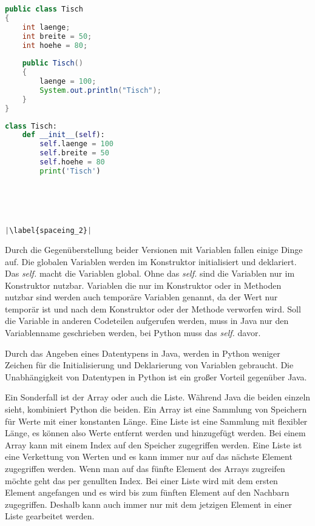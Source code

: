 \begin{minipage}{.5\linewidth}
\begin{lstlisting}[language=java,caption={Variablen in Java},captionpos=b,label={lst:java:variablen},frame=none,escapechar=|]
public class Tisch
{
    int laenge;
    int breite = 50;
    int hoehe = 80;
    
    public Tisch()
    {
        laenge = 100;
        System.out.println("Tisch");
    }
}
\end{lstlisting}
\end{minipage}
\begin{minipage}{.5\linewidth}
\begin{lstlisting}[language=python,caption={Variablen in Python},captionpos=b,label={lst:python:variablen},frame=l,escapechar=|]
class Tisch:
    def __init__(self):
        self.laenge = 100
        self.breite = 50
        self.hoehe = 80
        print('Tisch')





|\label{spaceing_2}|
\end{lstlisting}
\end{minipage}

Durch die Gegenüberstellung beider Versionen mit Variablen fallen einige Dinge auf. Die globalen Variablen werden im Konstruktor initialisiert und deklariert. Das \textit{self.} macht die Variablen global. Ohne das \textit{self.} sind die Variablen nur im Konstruktor nutzbar. Variablen die nur im Konstruktor oder in Methoden nutzbar sind werden auch temporäre Variablen genannt, da der Wert nur temporär ist und nach dem Konstruktor oder der Methode verworfen wird. Soll die Variable in anderen Codeteilen aufgerufen werden, muss in Java nur den Variablenname geschrieben werden, bei Python muss das \textit{self.} davor. \par
Durch das Angeben eines Datentypens in Java, werden in Python weniger Zeichen für die Initialisierung und Deklarierung von Variablen gebraucht. Die Unabhängigkeit von Datentypen in Python ist ein großer Vorteil gegenüber Java.\par
Ein Sonderfall ist der Array oder auch die Liste. Während Java die beiden einzeln sieht, kombiniert Python die beiden. Ein Array ist eine Sammlung von Speichern für Werte mit einer konstanten Länge. Eine Liste ist eine Sammlung mit flexibler Länge, es können also Werte entfernt werden und hinzugefügt werden. Bei einem Array kann mit einem Index auf den Speicher zugegriffen werden. Eine Liste ist eine Verkettung von Werten und es kann immer nur auf das nächste Element zugegriffen werden. Wenn man auf das fünfte Element des Arrays zugreifen möchte geht das per genullten Index. Bei einer Liste wird mit dem ersten Element angefangen und es wird bis zum fünften Element auf den Nachbarn zugegriffen. Deshalb kann auch immer nur mit dem jetzigen Element in einer Liste gearbeitet werden. \cite{NRWListe}\cite{Louis:2010}\cite{Python3:Buch}

